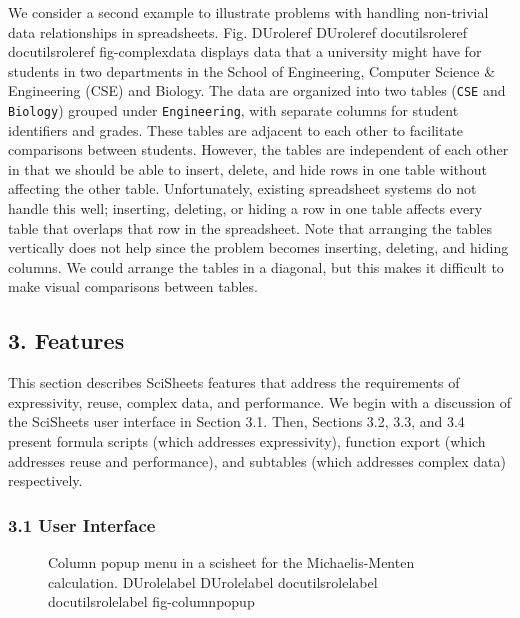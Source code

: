 \documentclass[letterpaper,compsoc,twoside]{IEEEtran}
\providecommand*{\DUrole}[2]{%
  \ifcsname DUrole#1\endcsname%
    \csname DUrole#1\endcsname{#2}%
  \else%
    \ifcsname docutilsrole#1\endcsname%
      \csname docutilsrole#1\endcsname{#2}%
    \else%
      #2%
    \fi%
  \fi%
}
\begin{document}
We consider a second example to illustrate problems with handling
non-trivial data relationships in spreadsheets.
Fig. \DUrole{ref}{fig-complexdata} displays data that a university
might have for students in two departments in the School of Engineering,
Computer Science \& Engineering (CSE) and Biology.
The data are organized into two tables
(\texttt{CSE} and \texttt{Biology}) grouped under
\texttt{Engineering}, with separate columns for student identifiers
and grades.
These tables
are adjacent to each other to facilitate comparisons between
students.
However, the tables are independent of each other
in that we should be able to insert, delete, and hide rows
in one table without affecting
the other table.
Unfortunately, existing spreadsheet systems do not handle this well;
inserting, deleting, or hiding
a row in one table affects every table that overlaps that row in the spreadsheet.
Note that arranging the tables vertically does not help since the problem
becomes inserting, deleting, and hiding columns.
We could arrange the tables in a diagonal, but
this makes it difficult to make visual comparisons between
tables.

\subsection{3. Features%
  \label{features}%
}


This section describes SciSheets features that address the requirements of expressivity, reuse, complex data,
and performance.
We begin
with a discussion of the SciSheets user interface in Section 3.1.
Then, Sections 3.2, 3.3, and 3.4 present formula scripts
(which addresses expressivity),
function export (which addresses reuse and performance), and
subtables (which addresses complex data) respectively.

\subsubsection{3.1 User Interface%
  \label{user-interface}%
}
\begin{figure}[]\noindent{}
\caption{Column popup menu in a scisheet for the Michaelis-Menten calculation. \DUrole{label}{fig-columnpopup}}
\end{figure}
\end{document}
